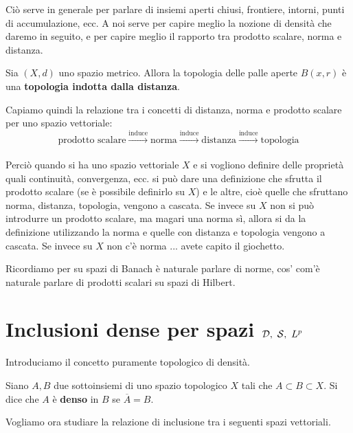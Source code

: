 Ciò serve in generale per parlare di insiemi aperti chiusi, frontiere, intorni, punti di accumulazione, ecc. A noi serve per capire meglio la nozione di densità che daremo in seguito, e per capire meglio il rapporto tra prodotto scalare, norma e distanza.

\begin{defn}
Sia $\left(X,d\right)$ uno spazio metrico. Allora la topologia delle palle aperte $B(x,r)$ è una \textbf{topologia indotta dalla distanza}. 
\end{defn}

Capiamo quindi la relazione tra i concetti di distanza, norma e prodotto scalare per uno spazio vettoriale:
\begin{equation*}
\text{prodotto scalare} \xrightarrow[]{\text{induce}}  \text{norma}  \xrightarrow[]{\text{induce}} \text{distanza} \xrightarrow[]{\text{induce}}  \text{topologia}
\end{equation*}

Perciò quando si ha uno spazio vettoriale $X$ e si vogliono definire delle proprietà quali continuità, convergenza, ecc. si può dare una definizione che sfrutta il prodotto scalare (se è possibile definirlo su $X$) e le altre, cioè quelle che sfruttano norma, distanza, topologia, vengono a cascata. Se invece su $X$ non si può introdurre un prodotto scalare, ma magari una norma sì, allora si da la definizione utilizzando la norma e quelle con distanza e topologia vengono a cascata. Se invece su $X$ non c'è norma ... avete capito il giochetto.

Ricordiamo per su spazi di Banach è naturale parlare di norme, cos' com'è naturale parlare di prodotti scalari su spazi di Hilbert.


\newpage

\section{Inclusioni dense per spazi \texorpdfstring{$\mathcal{D},\ \mathcal{S},\ L^p$}{C}}

Introduciamo il concetto puramente topologico di densità.

\begin{defn}
Siano $A,B$ due sottoinsiemi di uno spazio topologico $X$ tali che $A\subset B\subset X$. Si dice che $A$ è \textbf{denso} in $B$ se $\overline{A}=B$.
\end{defn}

Vogliamo ora studiare la relazione di inclusione tra i seguenti spazi vettoriali.

